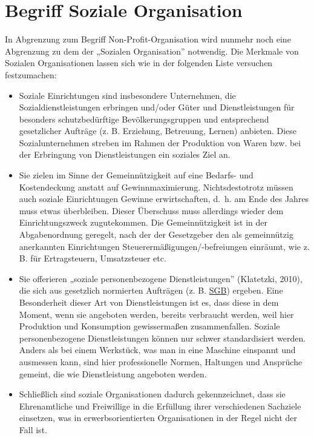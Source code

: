 \documentclass[
  letterpaper,
]{book}
\begin{document}
\section{Begriff Soziale
Organisation}\label{begriff-soziale-organisation}

In Abgrenzung zum Begriff Non-Profit-Organisation wird nunmehr noch eine
Abgrenzung zu dem der „Sozialen Organisation'' notwendig. Die Merkmale
von Sozialen Organisationen lassen sich wie in der folgenden Liste
versuchen festzumachen:

\begin{itemize}
\item
  Soziale Einrichtungen sind insbesondere Unternehmen, die
  Sozialdienstleistungen erbringen und/oder Güter und Dienstleistungen
  für besonders schutzbedürftige Bevölkerungsgruppen und entsprechend
  gesetzlicher Aufträge (z. B. Erziehung, Betreuung, Lernen) anbieten.
  Diese Sozialunternehmen streben im Rahmen der Produktion von Waren
  bzw. bei der Erbringung von Dienstleistungen ein soziales Ziel an.
\item
  Sie zielen im Sinne der Gemeinnützigkeit auf eine Bedarfs- und
  Kostendeckung anstatt auf Gewinnmaximierung. Nichtsdestotrotz müssen
  auch soziale Einrichtungen Gewinne erwirtschaften, d.~h. am Ende des
  Jahres muss etwas überbleiben. Dieser Überschuss muss allerdings
  wieder dem Einrichtungszweck zugutekommen. Die Gemeinnützigkeit ist in
  der Abgabenordnung geregelt, nach der der Gesetzgeber den als
  gemeinnützig anerkannten Einrichtungen Steuerermäßigungen/-befreiungen
  einräumt, wie z. B. für Ertragsteuern, Umsatzsteuer etc.
\item
  Sie offerieren „soziale personenbezogene Dienstleistungen''
  (Klatetzki, 2010), die sich aus gesetzlich normierten Aufträgen (z. B.
  \href{https://www.bpb.de/kurz-knapp/lexika/politiklexikon/18231/sozialgesetzbuch-sgb/}{SGB})
  ergeben. Eine Besonderheit dieser Art von Dienstleistungen ist es,
  dass diese in dem Moment, wenn sie angeboten werden, bereits
  verbraucht werden, weil hier Produktion und Konsumption gewissermaßen
  zusammenfallen. Soziale personenbezogene Dienstleistungen können nur
  schwer standardisiert werden. Anders als bei einem Werkstück, was man
  in eine Maschine einspannt und ausmessen kann, sind hier
  professionelle Normen, Haltungen und Ansprüche gemeint, die wie
  Dienstleistung angeboten werden.
\item
  Schließlich sind soziale Organisationen dadurch gekennzeichnet, dass
  sie Ehrenamtliche und Freiwillige in die Erfüllung ihrer verschiedenen
  Sachziele einsetzen, was in erwerbsorientierten Organisationen in der
  Regel nicht der Fall ist.
\end{itemize}
\end{document}
